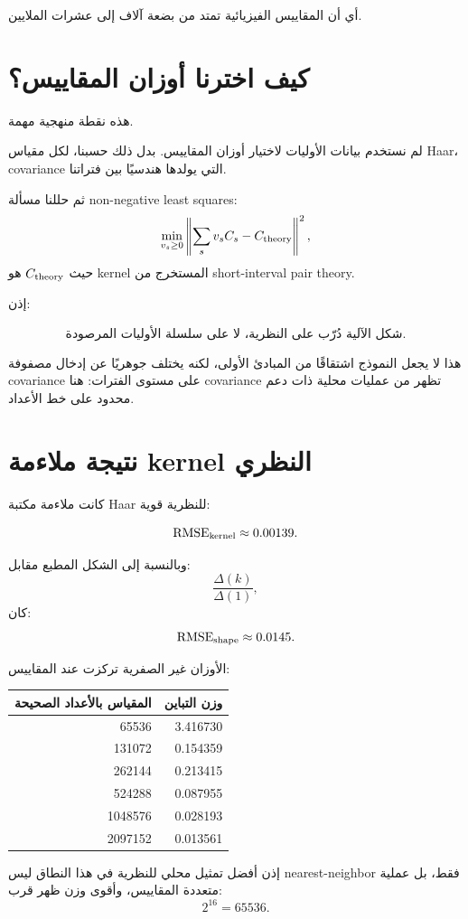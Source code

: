 \documentclass[12pt]{article}
\begin{document}
أي أن المقاييس الفيزيائية تمتد من بضعة آلاف إلى عشرات الملايين.

\section{كيف اخترنا أوزان المقاييس؟}

هذه نقطة منهجية مهمة.

لم نستخدم بيانات الأوليات لاختيار أوزان المقاييس.
بدل ذلك حسبنا، لكل مقياس Haar، covariance التي يولدها هندسيًا بين فتراتنا.

ثم حللنا مسألة non-negative least squares:
\[
\min_{v_s\ge0}
\left\|
\sum_s v_s C_s-C_{\rm theory}
\right\|^2,
\]
حيث \(C_{\rm theory}\) هو kernel المستخرج من short-interval pair theory.

إذن:

\[
\boxed{
\text{شكل الآلية دُرّب على النظرية، لا على سلسلة الأوليات المرصودة.}
}
\]

هذا لا يجعل النموذج اشتقاقًا من المبادئ الأولى، لكنه يختلف جوهريًا عن إدخال
مصفوفة covariance على مستوى الفترات: هنا covariance تظهر من عمليات محلية
ذات دعم محدود على خط الأعداد.

\section{نتيجة ملاءمة kernel النظري}

كانت ملاءمة مكتبة Haar للنظرية قوية:

\[
\mathrm{RMSE}_{\rm kernel}\approx0.00139.
\]

وبالنسبة إلى الشكل المطبع مقابل:
\[
\frac{\Delta(k)}{\Delta(1)},
\]
كان:
\[
\mathrm{RMSE}_{\rm shape}\approx0.0145.
\]

الأوزان غير الصفرية تركزت عند المقاييس:

\begin{center}
\begin{tabular}{rr}
\toprule
المقياس بالأعداد الصحيحة & وزن التباين\\
\midrule
65536   & 3.416730\\
131072  & 0.154359\\
262144  & 0.213415\\
524288  & 0.087955\\
1048576 & 0.028193\\
2097152 & 0.013561\\
\bottomrule
\end{tabular}
\end{center}

إذن أفضل تمثيل محلي للنظرية في هذا النطاق ليس nearest-neighbor فقط،
بل عملية متعددة المقاييس، وأقوى وزن ظهر قرب:
\[
2^{16}=65536.
\]
\end{document}
